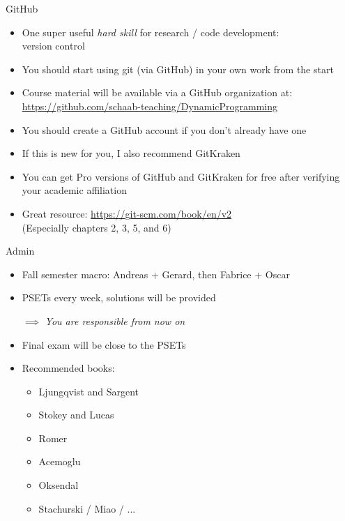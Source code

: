 \documentclass[10pt]{beamer}
\begin{document}
\begin{frame}{GitHub}
\begin{itemize}
\item One super useful \textit{hard skill} for research / code development: \\
version control

\item You should start using git (via GitHub) in your own work from the start

\item Course material will be available via a GitHub organization at:
\url{https://github.com/schaab-teaching/DynamicProgramming}

\item You should create a GitHub account if you don't already have one

\item If this is new for you, I also recommend GitKraken

\item You can get Pro versions of GitHub and GitKraken for free after verifying your academic affiliation

\item Great resource: \url{https://git-scm.com/book/en/v2} \\
(Especially chapters 2, 3, 5, and 6)

\end{itemize}
\end{frame}


\begin{frame}{Admin}
\begin{itemize}
\item Fall semester macro: Andreas + Gerard, then Fabrice + Oscar

\item PSETs every week, solutions will be provided

$\implies$ \textit{You are responsible from now on}

\item Final exam will be close to the PSETs

\item Recommended books:
\begin{itemize}
	\item Ljungqvist and Sargent
	\vspace{-3mm}
	\item Stokey and Lucas
	\vspace{-3mm}
	\item Romer
	\vspace{-3mm}
	\item Acemoglu
	\vspace{-3mm}
	\item Oksendal
	\vspace{-3mm}
	\item Stachurski / Miao / ...
\end{itemize}
\end{itemize}
\end{frame}
\end{document}
